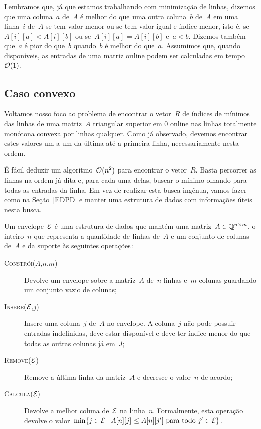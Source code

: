 Lembramos que, já que estamos trabalhando com minimização de linhas, dizemos que uma coluna~$a$ de~$A$ é melhor do que uma outra coluna~$b$ de~$A$ em uma linha~$i$ de~$A$ se tem valor menor ou se tem valor igual e índice menor, isto é, se~$A[i][a] < A[i][b]$ ou se~$A[i][a] = A[i][b]$ e~$a < b$. Dizemos também que~$a$ é pior do que~$b$ quando~$b$ é melhor do que~$a$. Assumimos que, quando disponíveis, as entradas de uma matriz online podem ser calculadas em tempo~$\mathcal{O}(1)$.


\subsection{Caso convexo} \label{Online:convex}

Voltamos nosso foco ao problema de encontrar o vetor~$R$ de índices de mínimos das linhas de uma matriz~$A$ triangular superior em 0 online nas linhas totalmente monótona convexa por linhas qualquer. Como já observado, devemos encontrar estes valores um a um da última até a primeira linha, necessariamente nesta ordem. 

É fácil deduzir um algoritmo~$\mathcal{O}(n^2)$ para encontrar o vetor~$R$. Basta percorrer as linhas na ordem já dita e, para cada uma delas, buscar o mínimo olhando para todas as entradas da linha. Em vez de realizar esta busca ingênua, vamos fazer como na Seção~\ref{EDPD} e manter uma estrutura de dados com informações úteis nesta busca.

\begin{defi}[Envelope]
Um envelope~$\mathcal{E}$ é uma estrutura de dados que mantém uma matriz~${ A \in \mathbb{Q}^{ n \times m } }$, o inteiro~$n$ que representa a quantidade de linhas de~$A$ e um conjunto de colunas de~$A$ e da suporte às seguintes operações:

\begin{description}
    \item[\textsc{Constrói}($A$,$n$,$m$)] Devolve um envelope sobre a matriz~$A$ de~$n$ linhas e~$m$ colunas guardando um conjunto vazio de colunas;
    \item[\textsc{Insere}($\mathcal{E}$,$j$)] Insere uma coluna~$j$ de~$A$ no envelope. A coluna~$j$ não pode possuir entradas indefinidas, deve estar disponível e deve ter índice menor do que todas as outras colunas já em~$J$;
    \item[\textsc{Remove}($\mathcal{E}$)] Remove a última linha da matriz~$A$ e decresce o valor~$n$ de acordo;
    \item[\textsc{Calcula}($\mathcal{E})$] Devolve a melhor coluna de~$\mathcal{E}$ na linha~$n$. Formalmente, esta operação devolve o valor~${ \min\{ j \in \mathcal{E} \mid A[n][j] \leq A[n][j'] \text{ para todo } j' \in \mathcal{E} \} }$.
\end{description}
\end{defi}

